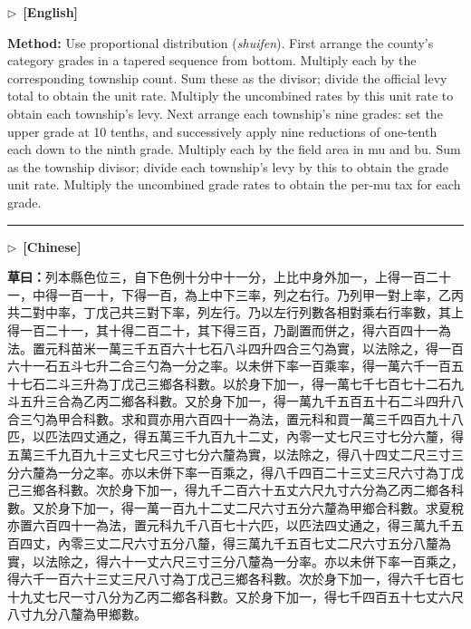 \documentclass[10pt,a4paper]{article}
\newcommand{\longline}{\par\noindent\rule{\textwidth}{0.4pt}\par}
\newcommand{\CNmarker}{\noindent\textcolor{cnlabel}{$\triangleright$\ \textbf{[Chinese]}}\par}
\newcommand{\ENmarker}{\noindent\textcolor{enlabel}{$\triangleright$\ \textbf{[English]}}\par}
\newcommand{\Working}[1]{\par\noindent\textbf{\color{workingcolor}草曰：}#1\par}
\newcommand{\MethodEn}[1]{\par\noindent\textbf{\color{methodcolor}Method:} #1\par}
\begin{document}
\ENmarker
\MethodEn{Use proportional distribution (\textit{shuifen}). First arrange the county's category grades in a tapered sequence from bottom. Multiply each by the corresponding township count. Sum these as the divisor; divide the official levy total to obtain the unit rate. Multiply the uncombined rates by this unit rate to obtain each township's levy. Next arrange each township's nine grades: set the upper grade at 10 tenths, and successively apply nine reductions of one-tenth each down to the ninth grade. Multiply each by the field area in mu and bu. Sum as the township divisor; divide each township's levy by this to obtain the grade unit rate. Multiply the uncombined grade rates to obtain the per-mu tax for each grade.}

\longline

\CNmarker
\Working{列本縣色位三，自下色例十分中十一分，上比中身外加一，上得一百二十一，中得一百一十，下得一百，為上中下三率，列之右行。乃列甲一對上率，乙丙共二對中率，丁戊己共三對下率，列左行。乃以左行列數各相對乘右行率數，其上得一百二十一，其十得二百二十，其下得三百，乃副置而併之，得六百四十一為法。置元科苗米一萬三千五百六十七石八斗四升四合三勺為實，以法除之，得一百六十一石五斗七升二合三勺為一分之率。以未併下率一百乘率，得一萬六千一百五十七石二斗三升為丁戊己三鄉各科數。以於身下加一，得一萬七千七百七十二石九斗五升三合為乙丙二鄉各科數。又於身下加一，得一萬九千五百五十石二斗四升八合三勺為甲合科數。求和買亦用六百四十一為法，置元科和買一萬三千四百九十八匹，以匹法四丈通之，得五萬三千九百九十二丈，內零一丈七尺三寸七分六釐，得五萬三千九百九十三丈七尺三寸七分六釐為實，以法除之，得八十四丈二尺三寸三分六釐為一分之率。亦以未併下率一百乘之，得八千四百二十三丈三尺六寸為丁戊己三鄉各科數。次於身下加一，得九千二百六十五丈六尺九寸六分為乙丙二鄉各科數。又於身下加一，得一萬一百九十二丈二尺六寸五分六釐為甲鄉合科數。求夏稅亦置六百四十一為法，置元科九千八百七十六匹，以匹法四丈通之，得三萬九千五百四丈，內零三丈二尺六寸五分八釐，得三萬九千五百七丈二尺六寸五分八釐為實，以法除之，得六十一丈六尺三寸三分八釐為一分率。亦以未併下率一百乘之，得六千一百六十三丈三尺八寸為丁戊己三鄉各科數。次於身下加一，得六千七百七十九丈七尺一寸八分为乙丙二鄉各科數。又於身下加一，得七千四百五十七丈六尺八寸九分八釐為甲鄉數。}
\end{document}
